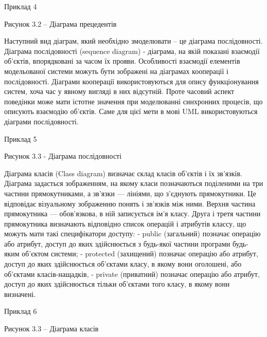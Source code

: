 Приклад 4
 

Рисунок 3.2 – Діаграма прецедентів

Наступний вид діаграм, який необхідно змоделювати – це діаграма послідовності.
Діаграма послідовності (sequence diagram) - діаграма, на якій показані взаємодії об'єктів, впорядковані за часом їх прояви. 
Особливості взаємодії елементів модельованої системи можуть бути зображені на діаграмах кооперації і послідовності. Діаграми кооперації використовуються для опису функціонування систем, хоча час у явному вигляді в них відсутній. Проте часовий аспект поведінки може мати істотне значення при моделюванні синхронних процесів, що описують взаємодію об'єктів. Саме для цієї мети в мові UML використовуються діаграми послідовності.

Приклад 5

Рисунок 3.3 -  Діаграма послідовності

Діаграма  класів (Class diagram) визначає склад класів об'єктів і їх зв'язків. Діаграма задасться зображенням, на якому класи позначаються поділеними на три частини прямокутниками, а зв'язки — лініями, що з'єднують прямокутники. Це відповідає візуальному зображенню понять і зв'язків між ними. Верхня частина прямокутника — обов'язкова, в ній записується ім'я класу. Друга і третя частини прямокутника визначають відповідно список операцій і атрибутів классу, що можуть мати такі специфікатори доступу:
- public (загальний) позначає операцію або атрибут, доступ до яких здійснюється з будь-якої частини програми будь-яким об'єктом системи;
- protected (захищений) позначає операцію або атрибут, доступ до яких здійснюється об'єктами  класу, в якому вони оголошені, або об'єктами класів-нащадків,
- private (приватний) позначає операцію або атрибут, доступ до яких здійснюється тільки об'єктами того класу, в якому вони визначені.

Приклад 6 
 
Рисунок 3.3 – Діаграма класів

